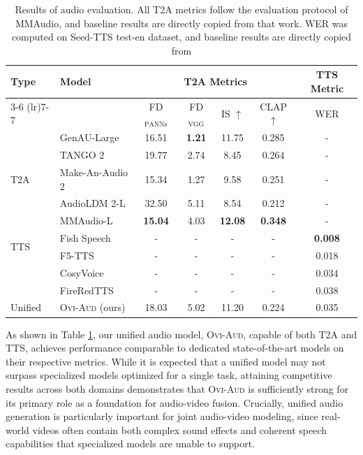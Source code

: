 \documentclass{article} %
\begin{document}
\begin{table}[ht]
\caption{Results of audio evaluation. All T2A metrics follow the evaluation protocol of MMAudio, and baseline results are directly copied from that work. WER was computed on Seed-TTS test-en dataset\citep{anastassiou2024seed}, and baseline results are directly copied from \cite{chen2024f5}}
\label{tab:metrics}
\centering
\begin{tabular}{llcccc|c}
\toprule
\multirow{2}{*}{Type} & \multirow{2}{*}{Model} 
 & \multicolumn{4}{c}{T2A Metrics} & \multicolumn{1}{c}{TTS Metric} \\
\cmidrule(lr){3-6} \cmidrule(lr){7-7}
 &  & FD$_{\text{PANNs}}$  & FD$_{\text{VGG}}$  & IS $\uparrow$ & CLAP $\uparrow$ 
 & WER  \\
\midrule
\multirow{5}{*}{T2A} 
 & GenAU-Large     & 16.51 & \textbf{1.21} & 11.75 & 0.285 & - \\
 & TANGO 2         & 19.77 & 2.74 & 8.45 & 0.264 & - \\
 & Make-An-Audio 2 & 15.34 & 1.27 & 9.58 & 0.251 & - \\
 & AudioLDM 2-L    & 32.50 & 5.11 & 8.54 & 0.212 & - \\
 & MMAudio-L       & \textbf{15.04} & 4.03 & \textbf{12.08} & \textbf{0.348} & - \\
\midrule
\multirow{2}{*}{TTS} 
 & Fish Speech     & - & - & - & - & \textbf{0.008} \\
 & F5-TTS          & - & - & - & - & 0.018 \\
 & CosyVoice         & - & - & - & - & 0.034 \\
 & FireRedTTS         & - & - & - & - & 0.038 \\
\midrule
\multirow{1}{*}{Unified} 
 & \textsc{Ovi-Aud} (ours) & 18.03 & 5.02 & 11.20 & 0.224 & 0.035\\
\bottomrule
\end{tabular}
\end{table}

As shown in Table \ref{tab:metrics}, our unified audio model, \textsc{Ovi-Aud}, capable of both T2A and TTS, achieves performance comparable to dedicated state-of-the-art models on their respective metrics. While it is expected that a unified model may not surpass specialized models optimized for a single task, attaining competitive results across both domains demonstrates that \textsc{Ovi-Aud} is sufficiently strong for its primary role as a foundation for audio-video fusion. Crucially, unified audio generation is particularly important for joint audio-video modeling, since real-world videos often contain both complex sound effects and coherent speech capabilities that specialized models are unable to support.
\end{document}

